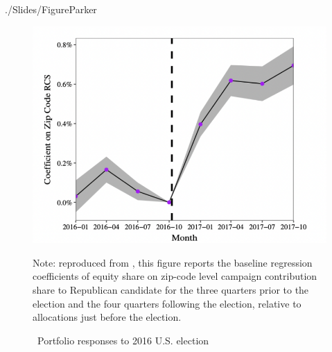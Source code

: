 


\begin{verbatimwrite}{./Slides/FigureParker}%
  \begin{figure}[!ht] \centering  %
    \caption{ ~Portfolio responses to 2016 U.S. election}
    \label{fig:parker}
    \centerline{\includegraphics[width=\textwidth]{./figures/parker}}
    \begin{flushleft}
      {\footnotesize Note: reproduced from \cite{meeuwis2018belief}, this figure reports the baseline regression coefficients of equity share on zip-code level  campaign contribution share to Republican candidate for the three quarters prior to the election and the four quarters following the election, relative to allocations just before the election.}
    \end{flushleft}
  \end{figure}
\end{verbatimwrite}%


